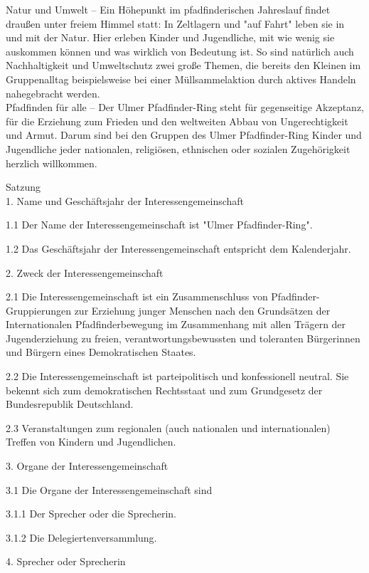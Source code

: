 Natur und Umwelt – Ein Höhepunkt im pfadfinderischen Jahreslauf findet draußen unter freiem Himmel 
statt: In Zeltlagern und "auf Fahrt" leben sie in und mit der Natur. Hier erleben Kinder und 
Jugendliche, mit wie wenig sie auskommen können und was wirklich von Bedeutung ist. So sind 
natürlich auch Nachhaltigkeit und Umweltschutz zwei große Themen, die bereits den Kleinen im 
Gruppenalltag beispielsweise bei einer Müllsammelaktion durch aktives Handeln nahegebracht werden.
\\

Pfadfinden für alle – Der Ulmer Pfadfinder-Ring steht für gegenseitige Akzeptanz, für die Erziehung 
zum Frieden und den weltweiten Abbau von Ungerechtigkeit und Armut. Darum sind bei den Gruppen des 
Ulmer Pfadfinder-Ring Kinder und Jugendliche jeder nationalen, religiösen, ethnischen oder sozialen 
Zugehörigkeit herzlich willkommen.

\newpage

Satzung
\\

1. Name und Geschäftsjahr der Interessengemeinschaft

1.1 Der Name der Interessengemeinschaft ist "Ulmer Pfadfinder-Ring".

1.2 Das Geschäftsjahr der Interessengemeinschaft entspricht dem Kalenderjahr.

2. Zweck der Interessengemeinschaft

2.1 Die Interessengemeinschaft ist ein Zusammenschluss von Pfadfinder-Gruppierungen zur Erziehung junger Menschen nach den Grundsätzen der Internationalen Pfadfinderbewegung im Zusammenhang mit allen Trägern der Jugenderziehung zu freien, verantwortungsbewussten und toleranten Bürgerinnen und Bürgern eines Demokratischen Staates.

2.2 Die Interessengemeinschaft ist parteipolitisch und konfessionell neutral. Sie bekennt sich zum demokratischen Rechtsstaat und zum Grundgesetz der Bundesrepublik Deutschland.

2.3 Veranstaltungen zum regionalen (auch nationalen und internationalen) Treffen von Kindern und Jugendlichen.

3. Organe der Interessengemeinschaft

3.1 Die Organe der Interessengemeinschaft sind

3.1.1 Der Sprecher oder die Sprecherin.

3.1.2 Die Delegiertenversammlung.

4. Sprecher oder Sprecherin

